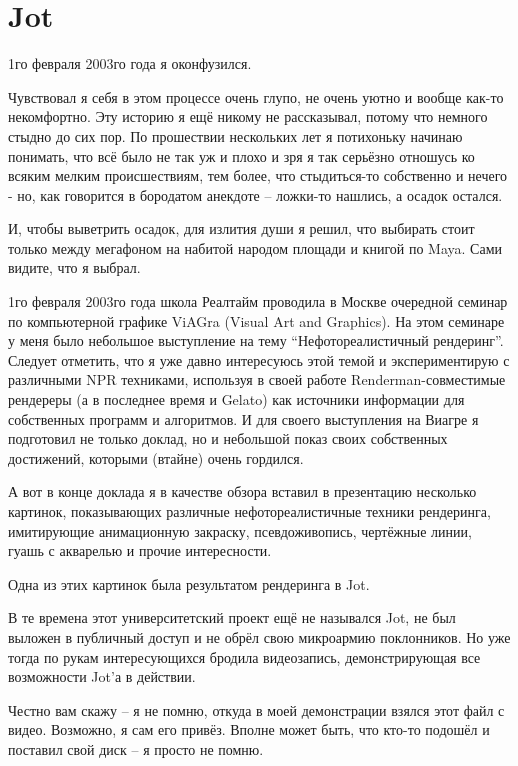  \chapter*{Jot}
  

 1го февраля 2003го года я оконфузился.
  

 Чувствовал я себя в этом процессе очень глупо, не
    очень уютно и вообще как-то некомфортно. Эту историю я ещё никому
    не рассказывал, потому что немного стыдно до сих пор. По прошествии
    нескольких лет я потихоньку начинаю понимать, что всё было не так
    уж и плохо и зря я так серьёзно отношусь ко всяким мелким
    происшествиям, тем более, что стыдиться-то собственно и нечего -
    но, как говорится в бородатом анекдоте – ложки-то нашлись, а осадок
    остался.
  

 И, чтобы выветрить осадок, для излития души я
    решил, что выбирать стоит только между мегафоном на набитой народом
    площади и книгой по Maya. Сами видите, что я выбрал.
  

 1го февраля 2003го года школа Реалтайм проводила в
    Москве очередной семинар по компьютерной графике ViAGra (Visual Art
    and Graphics). На этом семинаре у меня было небольшое выступление
    на тему “Нефотореалистичный рендеринг”. Следует отметить, что я уже
    давно интересуюсь этой темой и экспериментирую с различными NPR
    техниками, используя в своей работе Renderman-совместимые рендереры
    (а в последнее время и Gelato) как источники информации для
    собственных программ и алгоритмов. И для своего выступления на
    Виагре я подготовил не только доклад, но и небольшой показ своих
    собственных достижений, которыми (втайне) очень
    гордился.
  

 А вот в конце доклада я в качестве обзора вставил в
    презентацию несколько картинок, показывающих различные
    нефотореалистичные техники рендеринга, имитирующие анимационную
    закраску, псевдоживопись, чертёжные линии, гуашь с акварелью и
    прочие интересности.
  

 Одна из этих картинок была результатом рендеринга в
    Jot.
  

 В те времена этот университетский проект ещё не
    назывался Jot, не был выложен в публичный доступ и не обрёл свою
    микроармию поклонников. Но уже тогда по рукам интересующихся
    бродила видеозапись, демонстрирующая все возможности Jot’а в
    действии.
  

 Честно вам скажу – я не помню, откуда в моей
    демонстрации взялся этот файл с видео. Возможно, я сам его привёз.
    Вполне может быть, что кто-то подошёл и поставил свой диск – я
    просто не помню.
  

